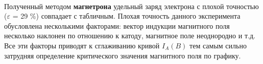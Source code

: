 \documentclass[a4paper, 12pt]{article}
\begin{document}
\paragraph{}Полученный методом \textbf{магнетрона} удельный заряд электрона с плохой точностью ($\varepsilon$ = 29 \%) совпадает с табличным. Плохая точность данного эксперимента обусловлена несколькими факторами: вектор индукции магнитного поля несколько наклонен по отношению к катоду, магнитное поле неоднородно и т.д. Все эти факторы приводят к сглаживанию кривой $I_A(B)$ тем самым сильно затрудняя определение критического значения магнитного поля по графику.
\end{document}
